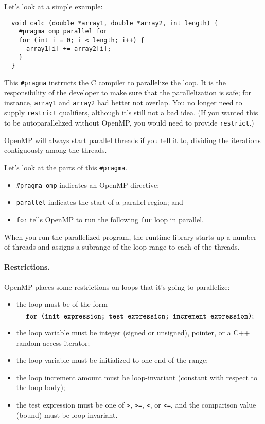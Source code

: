 Let's look at a simple example:
{\small
\begin{verbatim}
  void calc (double *array1, double *array2, int length) {
    #pragma omp parallel for
    for (int i = 0; i < length; i++) {
      array1[i] += array2[i];
    }
  }
\end{verbatim}
}
This \verb+#pragma+ instructs the C compiler to parallelize the
loop. It is the responsibility of the developer to make sure that
the parallelization is safe; for instance, {\tt array1} and {\tt array2}
had better not overlap. You no longer need to supply {\tt restrict}
qualifiers, although it's still not a bad idea. (If you wanted this
to be autoparallelized without OpenMP, you would need to provide
{\tt restrict}.)

OpenMP will always start parallel threads if you tell it to, dividing
the iterations contiguously among the threads.

Let's look at the parts of this \verb+#pragma+.
\begin{itemize}
\item \verb+#pragma omp+ indicates an OpenMP directive;
\item {\tt parallel} indicates the start of a parallel region; and
\item {\tt for} tells OpenMP to run the following {\tt for} loop in parallel.
\end{itemize}
When you run the parallelized program, the runtime library starts
up a number of threads and assigns a subrange of the loop range to 
each of the threads.

\paragraph{Restrictions.} OpenMP places some restrictions on
loops that it's going to parallelize:
\begin{itemize}
\item the loop must be of the form 
\[ \mbox{\tt for (init expression; test expression; increment expression)}; \]
\item the loop variable must be integer (signed or unsigned), pointer, or a C++
random access iterator;
\item the loop variable must be initialized to one end of the range;
\item the loop increment amount must be loop-invariant (constant with respect to the loop body); 
\item the test expression must be one of {\tt >}, {\tt >=}, {\tt <}, or {\tt <=}, and the comparison value (bound) must be loop-invariant.
\end{itemize}

